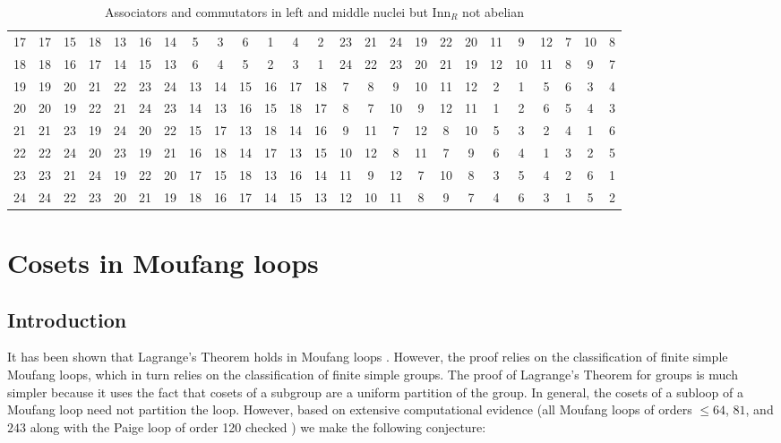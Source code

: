 \documentclass[12pt, twoside, openright]{report}
\theoremstyle{definition}
\newcommand{\inn}{\text{Inn}}       %
\begin{document}
\begin{table}[H]
{\begin{tabular}{c | c c c c c c c c c c c c c c c c c c c c c c c c|}
     17& 17& 15& 18& 13& 16& 14&  5&  3&  6&  1&  4&  2& 23& 21& 24& 19& 22& 20& 11&  9& 12&  7& 10&  8 \\
     18& 18& 16& 17& 14& 15& 13&  6&  4&  5&  2&  3&  1& 24& 22& 23& 20& 21& 19& 12& 10& 11&  8&  9&  7 \\
     19& 19& 20& 21& 22& 23& 24& 13& 14& 15& 16& 17& 18&  7&  8&  9& 10& 11& 12&  2&  1&  5&  6&  3&  4 \\
     20& 20& 19& 22& 21& 24& 23& 14& 13& 16& 15& 18& 17&  8&  7& 10&  9& 12& 11&  1&  2&  6&  5&  4&  3 \\
     21& 21& 23& 19& 24& 20& 22& 15& 17& 13& 18& 14& 16&  9& 11&  7& 12&  8& 10&  5&  3&  2&  4&  1&  6 \\
     22& 22& 24& 20& 23& 19& 21& 16& 18& 14& 17& 13& 15& 10& 12&  8& 11&  7&  9&  6&  4&  1&  3&  2&  5 \\
     23& 23& 21& 24& 19& 22& 20& 17& 15& 18& 13& 16& 14& 11&  9& 12&  7& 10&  8&  3&  5&  4&  2&  6&  1 \\
     24& 24& 22& 23& 20& 21& 19& 18& 16& 17& 14& 15& 13& 12& 10& 11&  8&  9&  7&  4&  6&  3&  1&  5&  2 \\
     \hline
    \end{tabular}}
  \caption{Associators and commutators in left and middle nuclei but $\inn_R$ not abelian}
\end{table}


\chapter{Cosets in Moufang loops}

\section{Introduction}

It has been shown that Lagrange's Theorem holds in Moufang loops \cite{LG}. However, the proof
  relies on the classification of finite simple Moufang loops, which in turn relies on the
  classification of finite simple groups. The proof of Lagrange's Theorem for groups is much
  simpler because it uses the fact that cosets of a subgroup are a uniform partition of the group.
  In general, the cosets of a subloop of a Moufang loop need not partition the loop. However, based
  on extensive computational evidence (all Moufang loops of orders $\leq 64$, $81$, and $243$ along
  with the Paige loop of order 120 checked \cite{LOOPS}) we make the following conjecture:
\end{document}
